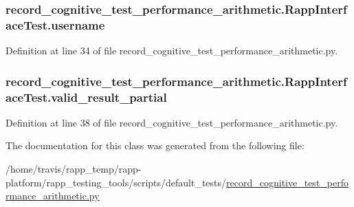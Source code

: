 \hypertarget{classrecord__cognitive__test__performance__arithmetic_1_1RappInterfaceTest_a9a6b95b2ba7b5f829f997611e0de5ce1}{
\subsubsection[{username}]{\setlength{\rightskip}{0pt plus 5cm}record\-\_\-cognitive\-\_\-test\-\_\-performance\-\_\-arithmetic.\-Rapp\-Interface\-Test.\-username}}\label{classrecord__cognitive__test__performance__arithmetic_1_1RappInterfaceTest_a9a6b95b2ba7b5f829f997611e0de5ce1}


Definition at line 34 of file record\-\_\-cognitive\-\_\-test\-\_\-performance\-\_\-arithmetic.\-py.

\hypertarget{classrecord__cognitive__test__performance__arithmetic_1_1RappInterfaceTest_a42cacb1cb721775a7dda5e95e73a2ef9}{
\subsubsection[{valid\-\_\-result\-\_\-partial}]{\setlength{\rightskip}{0pt plus 5cm}record\-\_\-cognitive\-\_\-test\-\_\-performance\-\_\-arithmetic.\-Rapp\-Interface\-Test.\-valid\-\_\-result\-\_\-partial}}\label{classrecord__cognitive__test__performance__arithmetic_1_1RappInterfaceTest_a42cacb1cb721775a7dda5e95e73a2ef9}


Definition at line 38 of file record\-\_\-cognitive\-\_\-test\-\_\-performance\-\_\-arithmetic.\-py.



The documentation for this class was generated from the following file\-:\begin{DoxyCompactItemize}
\item 
/home/travis/rapp\-\_\-temp/rapp-\/platform/rapp\-\_\-testing\-\_\-tools/scripts/default\-\_\-tests/\hyperlink{record__cognitive__test__performance__arithmetic_8py}{record\-\_\-cognitive\-\_\-test\-\_\-performance\-\_\-arithmetic.\-py}\end{DoxyCompactItemize}
